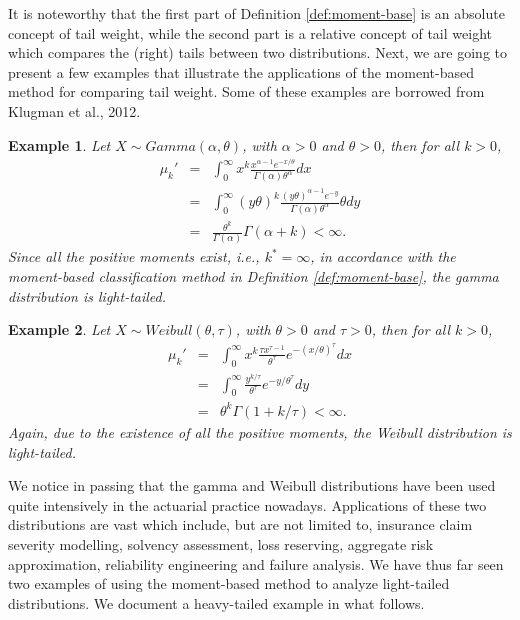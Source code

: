 \documentclass[12pt]{article}
\newtheorem{example}{\bf Example}
\begin{document}
It is noteworthy that the first part of Definition \ref{def:moment-base} is an absolute concept of tail weight, while the second part is a relative concept of tail weight which compares the (right) tails between two distributions.  Next, we are going to present a few examples that illustrate the applications of the moment-based method for comparing tail weight.  Some of these examples are borrowed from Klugman et al., 2012.

\begin{example}
\label{exm:gamma}  Let $X\sim Gamma(\alpha,\theta)$, with $\alpha>0$ and $\theta>0$, then for all $k>0$,
\begin{eqnarray*}
    \mu_k' &=& \int_0^{\infty} x^k \frac{x^{\alpha-1} e^{-x/\theta}}{\Gamma(\alpha) \theta^{\alpha}} dx \\
    &=& \int_0^{\infty} (y\theta)^k  \frac{(y\theta)^{\alpha-1} e^{-y}}{\Gamma(\alpha) \theta^{\alpha}} \theta dy \\
    &=& \frac{\theta^k}{\Gamma(\alpha)} \Gamma(\alpha+k) < \infty.\end{eqnarray*}
Since all the positive moments exist, i.e., $k^{\ast}=\infty$, in accordance with the moment-based classification method in Definition \ref{def:moment-base}, the gamma distribution is light-tailed.
\end{example}

\begin{example}
\label{exm:weibull}
Let $X\sim Weibull(\theta,\tau)$, with $\theta>0$ and $\tau>0$, then for all $k>0$,
\begin{eqnarray*}
    \mu_k' &=& \int_0^{\infty} x^k \frac{\tau x^{\tau-1} }{\theta^{\tau}} e^{-(x/\theta)^{\tau}}dx \\
    &=& \int_0^{\infty}  \frac{ y^{k/\tau} }{\theta^{\tau}} e^{-y/\theta^{\tau}}dy \\
    &=& \theta^{k} \Gamma(1+k/\tau) < \infty.\end{eqnarray*}
Again, due to the existence of all the positive moments, the Weibull distribution is light-tailed.
\end{example}

We notice in passing that the gamma and Weibull distributions have been used quite intensively in the actuarial practice nowadays.  Applications of these two distributions are vast which include, but are not limited to, insurance claim severity modelling, solvency assessment, loss reserving, aggregate risk approximation, reliability engineering and failure analysis.   We have thus far seen two examples of using the moment-based method to analyze light-tailed distributions.  We document a heavy-tailed example in what follows.
\end{document}
